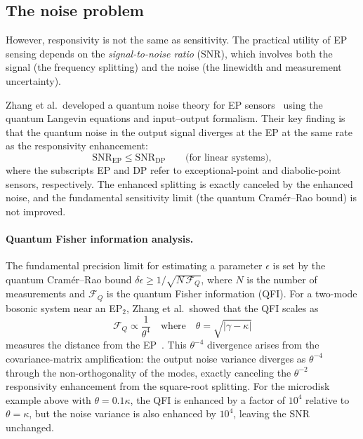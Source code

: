 \subsection{The noise problem}
\label{ssec:ep-noise}

However, responsivity is not the same as sensitivity. The practical
utility of EP sensing depends on the \emph{signal-to-noise ratio} (SNR),
which involves both the signal (the frequency splitting) and the noise
(the linewidth and measurement uncertainty).

Zhang et al.\ developed a quantum noise theory for EP
sensors~\cite{zhang2018quantum} using the quantum Langevin equations and
input--output formalism. Their key finding is that the quantum noise in
the output signal diverges at the EP at the same rate as the responsivity
enhancement:
\begin{equation}
 \text{SNR}_{\mathrm{EP}} \le \text{SNR}_{\mathrm{DP}}
 \qquad\text{(for linear systems)},
 \label{eq:snr-bound}
\end{equation}
where the subscripts EP and DP refer to exceptional-point and
diabolic-point sensors, respectively. The enhanced splitting is exactly
canceled by the enhanced noise, and the fundamental sensitivity limit
(the quantum Cram\'er--Rao bound) is not improved.

\paragraph{Quantum Fisher information analysis.}
The fundamental precision limit for estimating a parameter $\epsilon$
is set by the quantum Cram\'er--Rao bound
$\delta\epsilon \ge 1/\sqrt{N\,\mathcal{F}_Q}$, where $N$ is the
number of measurements and $\mathcal{F}_Q$ is the quantum Fisher
information (QFI). For a two-mode bosonic system near an EP$_2$,
Zhang et al.\ showed that the QFI scales as
\begin{equation}
 \mathcal{F}_Q \propto \frac{1}{\theta^4}
 \quad\text{where}\quad \theta = \sqrt{|\gamma - \kappa|}
 \label{eq:qfi-ep}
\end{equation}
measures the distance from the EP~\cite{zhang2018quantum}. This
$\theta^{-4}$ divergence arises from the covariance-matrix
amplification: the output noise variance diverges as $\theta^{-4}$
through the non-orthogonality of the modes, exactly canceling the
$\theta^{-2}$ responsivity enhancement from the square-root
splitting. For the microdisk example above with
$\theta = 0.1\kappa$, the QFI is enhanced by a factor of $10^4$
relative to $\theta = \kappa$, but the noise variance is also
enhanced by $10^4$, leaving the SNR unchanged.

